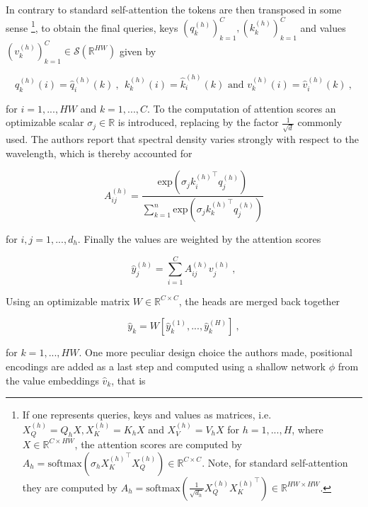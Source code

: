 In contrary to standard self-attention the tokens are then transposed in some sense
\footnote{If one represents queries, keys and values as matrices, i.e. $X_Q^{(h)} = Q_hX, X_K^{(h)} = K_hX$ and $X_V^{(h)} = V_hX$ for $h = 1, ..., H$,
where $X \in \mathbb R^{C \times HW}$,
the attention scores are computed by $A_h = \text{softmax}( \sigma_h {X_K^{(h)}}^\top X_Q^{(h)}) \in \mathbb R^{C \times C}$.
Note, for standard self-attention they are computed by $A_h = \text{softmax}( \frac{1}{\sqrt{d_h}} X_Q^{(h)} {X_K^{(h)}}^\top) \in \mathbb R^{HW \times HW}$.}, 
to obtain the final queries, keys $(q_k^{(h)})_{k=1}^{C}, (k_k^{(h)})_{k=1}^{C}$ and values $(v_k^{(h)})_{k=1}^{C} \in \mathcal{S} (\mathbb R^{HW})$
given by

    \begin{equation} \label{eq:smsa2}
        q_k^{(h)}(i) = \hat{q}_i^{(h)}(k) ~, ~~ k_k^{(h)}(i) = \hat{k}_i^{(h)}(k) \text{ and } v_k^{(h)}(i) = \hat{v}_i^{(h)}(k) ~,
    \end{equation}

for $i = 1, ..., HW$ and $k = 1, ..., C$.
To the computation of attention scores an optimizable scalar $\sigma_j \in \mathbb R$ is introduced,
replacing by the factor $\frac{1}{\sqrt{d}}$ commonly used. 
The authors report that spectral density varies strongly with respect to the wavelength,
which is thereby accounted for

    \begin{equation} \label{eq:smsa3}
        A_{ij}^{(h)} = \frac{\text{exp} \left( \sigma_j {k_{i}^{(h)}}^\top q_{j}^{(h)} \right)}{\sum_{k = 1}^n \text{exp} \left( \sigma_j {k_{k}^{(h)}}^\top q_{j}^{(h)} \right)}
    \end{equation}

for $i, j = 1, ..., d_h$.
Finally the values are weighted by the attention scores

    \begin{equation} \label{eq:smsa4}
        \hat{y}_j^{(h)} = \sum_{i=1}^{C} A_{ij}^{(h)} v_j^{(h)} ~,
    \end{equation}

Using an optimizable matrix $W \in \mathbb R^{C \times C}$, 
the heads are merged back together 

    \begin{equation} \label{eq:smsa5}
        \hat{y}_k = W [\hat{y}_k^{(1)}, ..., \hat{y}_k^{(H)}] ~,
    \end{equation}

for $k = 1, ..., HW$. 
One more peculiar design choice the authors made,
positional encodings are added as a last step and computed using a shallow network $\phi$ from the value embeddings $\hat{v}_k$,
that is 

